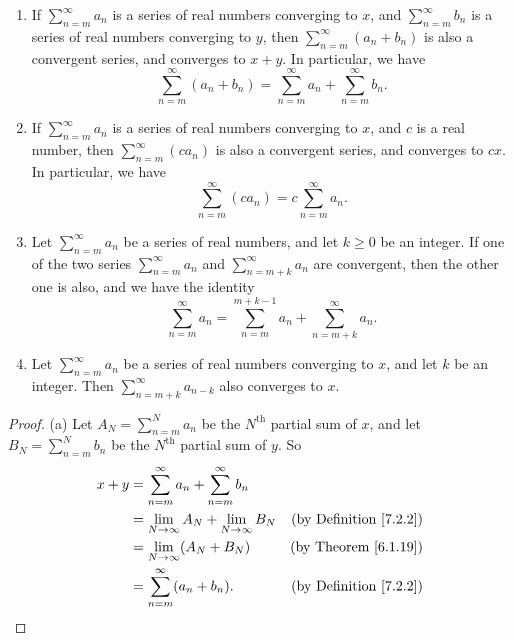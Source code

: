 \setcounter{theorem}{13}
\begin{proposition}\label{7.2.14}
    \mbox{}
    \begin{enumerate}
        \item If \(\sum_{n = m}^\infty a_n\) is a series of real numbers converging to \(x\), and \(\sum_{n = m}^\infty b_n\) is a series of real numbers converging to \(y\), then \(\sum_{n = m}^\infty (a_n + b_n)\) is also a convergent series, and converges to \(x + y\).
        In particular, we have
        \[
            \sum_{n = m}^\infty (a_n + b_n) = \sum_{n = m}^\infty a_n + \sum_{n = m}^\infty b_n.
        \]
        \item If \(\sum_{n = m}^\infty a_n\) is a series of real numbers converging to \(x\), and \(c\) is a real number, then \(\sum_{n = m}^\infty (c a_n)\) is also a convergent series, and converges to \(cx\).
        In particular, we have
        \[
            \sum_{n = m}^\infty (c a_n) = c \sum_{n = m}^\infty a_n.
        \]
        \item Let \(\sum_{n = m}^\infty a_n\) be a series of real numbers, and let \(k \geq 0\) be an integer.
        If one of the two series \(\sum_{n = m}^\infty a_n\) and \(\sum_{n = m + k}^\infty a_n\) are convergent, then the other one is also, and we have the identity
        \[
            \sum_{n = m}^\infty a_n = \sum_{n = m}^{m + k - 1} a_n + \sum_{n = m + k}^\infty a_n.
        \]
        \item Let \(\sum_{n = m}^\infty a_n\) be a series of real numbers converging to \(x\), and let \(k\) be an integer.
        Then \(\sum_{n = m + k}^\infty a_{n - k}\) also converges to \(x\).
    \end{enumerate}
\end{proposition}

\begin{proof}{(a)}
Let \(A_N = \sum_{n = m}^N a_n\) be the \(N^{\text{th}}\) partial sum of \(x\), and let \(B_N = \sum_{n = m}^N b_n\) be the \(N^{\text{th}}\) partial sum of \(y\).
So
\begin{align*}
x + y &= \sum_{n = m}^\infty a_n + \sum_{n = m}^\infty b_n \\
&= \lim_{N \to \infty} A_N + \lim_{N \to \infty} B_N & \text{(by Definition \ref{7.2.2})} \\
&= \lim_{N \to \infty} (A_N + B_N) & \text{(by Theorem \ref{6.1.19})} \\
&= \sum_{n = m}^\infty (a_n + b_n). & \text{(by Definition \ref{7.2.2})}
\end{align*}
\end{proof}

